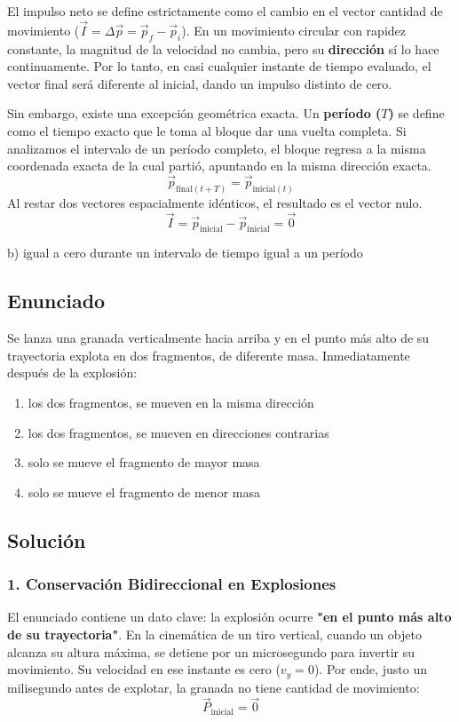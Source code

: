 \documentclass[12pt, a4paper]{article}
\begin{document}
El impulso neto se define estrictamente como el cambio en el vector cantidad de movimiento ($\vec{I} = \Delta\vec{p} = \vec{p}_f - \vec{p}_i$).
En un movimiento circular con rapidez constante, la magnitud de la velocidad no cambia, pero su \textbf{dirección} sí lo hace continuamente. Por lo tanto, en casi cualquier instante de tiempo evaluado, el vector final será diferente al inicial, dando un impulso distinto de cero.

Sin embargo, existe una excepción geométrica exacta. Un \textbf{período ($T$)} se define como el tiempo exacto que le toma al bloque dar una vuelta completa.
Si analizamos el intervalo de un período completo, el bloque regresa a la misma coordenada exacta de la cual partió, apuntando en la misma dirección exacta.
$$ \vec{p}_{\text{final}(t+T)} = \vec{p}_{\text{inicial}(t)} $$
Al restar dos vectores espacialmente idénticos, el resultado es el vector nulo.
$$ \vec{I} = \vec{p}_{\text{inicial}} - \vec{p}_{\text{inicial}} = \vec{0} $$

\begin{tcolorbox}[colback=green!5!white, colframe=green!50!black, title=Respuesta Final]
\centering \Large b) igual a cero durante un intervalo de tiempo igual a un período
\end{tcolorbox}

\newpage

\subsection*{Enunciado}
Se lanza una granada verticalmente hacia arriba y en el punto más alto de su trayectoria explota en dos fragmentos, de diferente masa. Inmediatamente después de la explosión:
\begin{enumerate}[label=\alph*)]
    \item los dos fragmentos, se mueven en la misma dirección
    \item los dos fragmentos, se mueven en direcciones contrarias
    \item solo se mueve el fragmento de mayor masa
    \item solo se mueve el fragmento de menor masa
\end{enumerate}

\subsection*{Solución}

\subsubsection*{1. Conservación Bidireccional en Explosiones}
El enunciado contiene un dato clave: la explosión ocurre \textbf{"en el punto más alto de su trayectoria"}.
En la cinemática de un tiro vertical, cuando un objeto alcanza su altura máxima, se detiene por un microsegundo para invertir su movimiento. Su velocidad en ese instante es cero ($v_y = 0$).
Por ende, justo un milisegundo antes de explotar, la granada no tiene cantidad de movimiento:
$$ \vec{P}_{\text{inicial}} = \vec{0} $$
\end{document}
